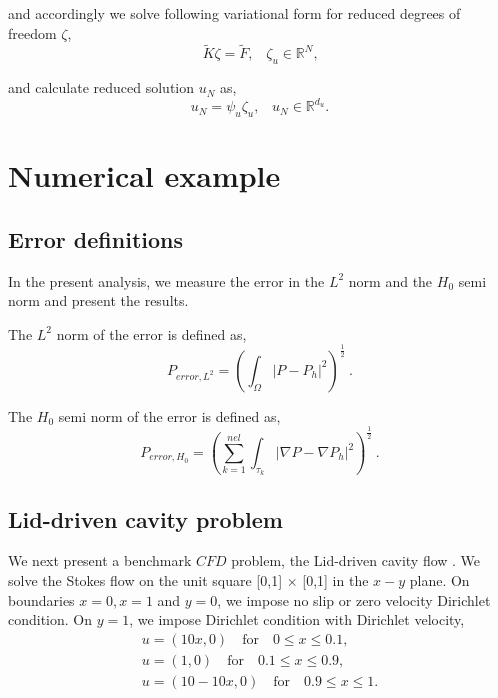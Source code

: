 \documentclass[a4paper,oneside,openright,spanish,english]{book}
\begin{document}
and accordingly we solve following variational form for reduced degrees of freedom $\zeta$,
\begin{equation}
\tilde{K} \zeta = \tilde{F} \textrm{,} \quad \zeta_u \in \mathbb{R}^{N} \textrm{,}
\end{equation}

and calculate reduced solution $u_N$ as,
\begin{equation}
u_N = \psi_u \zeta_u \textrm{,} \quad u_N \in \mathbb{R}^{d_u} \textrm{.}
\end{equation}

\chapter{Numerical example}

\section{Error definitions}

In the present analysis, we measure the error in the $L^2$ norm and the $H_0$ semi norm and present the results.

The $L^2$ norm of the error is defined as,
\begin{equation*}
P_{error,L^2} = (\int_{\Omega} |P - P_h|^2 )^{\frac{1}{2}} \ .
\end{equation*}

The $H_0$ semi norm of the error is defined as,
\begin{equation*}
P_{error,H_0} = (\sum_{k=1}^{nel} \int_{\tau_k} |\nabla P - \nabla P_h|^2)^{\frac{1}{2}} \ .
\end{equation*}

\section{Lid-driven cavity problem} \label{lid_driven_cavity_stokes}

We next present a benchmark $CFD$ problem, the Lid-driven cavity flow \cite{Montlaur2}. We solve the Stokes flow on the unit square [0,1] $\times$ [0,1] in the $x-y$ plane. On boundaries ${x = 0}, {x = 1}$ and ${y = 0}$, we impose no slip or zero velocity Dirichlet condition. On ${y = 1}$, we impose Dirichlet condition with Dirichlet velocity,
\begin{equation}
\begin{split}
u = (10x,0) \quad \textrm{for} \quad 0 \leq x \leq 0.1 \textrm{,}\\
u = (1,0) \quad \textrm{for} \quad 0.1 \leq x \leq 0.9 \textrm{,}\\
u = (10 - 10x,0) \quad \textrm{for} \quad 0.9 \leq x \leq 1 \textrm{.}
\end{split}
\end{equation}
\end{document}
